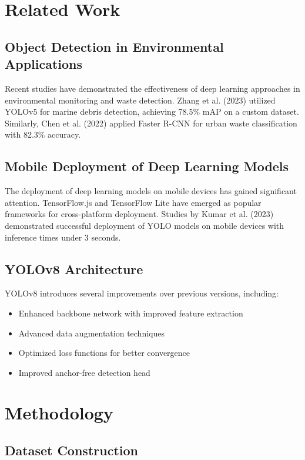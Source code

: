 \documentclass[12pt,a4paper]{article}
\begin{document}
\section{Related Work}

\subsection{Object Detection in Environmental Applications}
Recent studies have demonstrated the effectiveness of deep learning approaches in environmental monitoring and waste detection. Zhang et al. (2023) utilized YOLOv5 for marine debris detection, achieving 78.5\% mAP on a custom dataset. Similarly, Chen et al. (2022) applied Faster R-CNN for urban waste classification with 82.3\% accuracy.

\subsection{Mobile Deployment of Deep Learning Models}
The deployment of deep learning models on mobile devices has gained significant attention. TensorFlow.js and TensorFlow Lite have emerged as popular frameworks for cross-platform deployment. Studies by Kumar et al. (2023) demonstrated successful deployment of YOLO models on mobile devices with inference times under 3 seconds.

\subsection{YOLOv8 Architecture}
YOLOv8 introduces several improvements over previous versions, including:
\begin{itemize}
    \item Enhanced backbone network with improved feature extraction
    \item Advanced data augmentation techniques
    \item Optimized loss functions for better convergence
    \item Improved anchor-free detection head
\end{itemize}

\section{Methodology}

\subsection{Dataset Construction}
\end{document}
